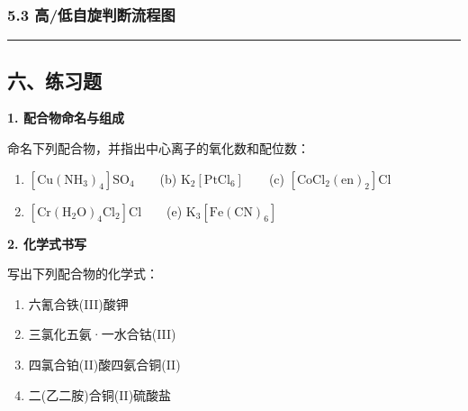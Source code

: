 \subsubsection{5.3 高/低自旋判断流程图}\label{ux9ad8ux4f4eux81eaux65cbux5224ux65adux6d41ux7a0bux56fe}

\begin{Shaded}
\begin{Highlighting}[]
\end{Highlighting}
\end{Shaded}

\begin{center}\rule{0.5\linewidth}{0.5pt}\end{center}

\subsection{六、练习题}\label{ux516dux7ec3ux4e60ux9898}

\textbf{1. 配合物命名与组成}

命名下列配合物，并指出中心离子的氧化数和配位数：

\begin{enumerate}
\def\labelenumi{(\alph{enumi})}
\tightlist
\item
  \(\mathrm{[Cu(NH_3)_4]SO_4}\)　　(b) \(\mathrm{K_2[PtCl_6]}\)　　(c) \(\mathrm{[CoCl_2(en)_2]Cl}\)
\item
  \(\mathrm{[Cr(H_2O)_4Cl_2]Cl}\)　　(e) \(\mathrm{K_3[Fe(CN)_6]}\)
\end{enumerate}

\textbf{2. 化学式书写}

写出下列配合物的化学式：

\begin{enumerate}
\def\labelenumi{(\alph{enumi})}
\tightlist
\item
  六氰合铁(III)酸钾
\item
  三氯化五氨·一水合钴(III)
\item
  四氯合铂(II)酸四氨合铜(II)
\item
  二(乙二胺)合铜(II)硫酸盐
\end{enumerate}

